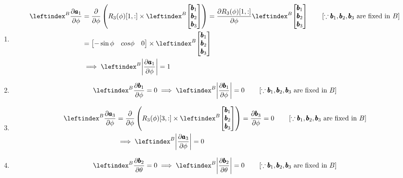 \begin{enumerate}
 \item
 \begin{align*}
   \lx{^B}{\frac {\partial \pmb a_1}  {\partial \phi}}&=
   \frac{\partial}{\partial \phi} \left(R_3(\phi)[1, :]  \times \lx{^B}{\bm{\pmb b_1 \\ \pmb b_2 \\ \pmb b_3}} \right)
   = \frac{\partial R_3(\phi)[1, :]}{\partial \phi} \lx{^B}{\bm{\pmb b_1 \\ \pmb b_2 \\ \pmb b_3}}
   \qquad \left[\because \pmb b_1, \pmb b_2,  \pmb b_3
   \text{ are fixed in } B \right]\\
   &= \bm{-\sin \phi & cos \phi & 0}
    \times \lx{^B}{\bm{\pmb b_1 \\ \pmb b_2 \\ \pmb b_3}}\\
    &\implies \lx{^B}{\norm{\frac {\partial \pmb a_1}  {\partial \phi}}} = 1
 \end{align*}

 \item
 \begin{align*}
    \lx{^B}{\frac {\partial \pmb b_1}  {\partial \phi}} &= 0
    \implies \lx{^B}{\norm{ \frac {\partial \pmb b_1}  {\partial \phi}}} = 0
   \qquad \left[\because \pmb b_1, \pmb b_2,  \pmb b_3
   \text{ are fixed in } B \right]\\
 \end{align*}

 \item
 \begin{align*}
    \lx{^B}{\frac {\partial \pmb a_3}  {\partial \phi}} &=
   \frac{\partial}{\partial \phi} \left(R_3(\phi)[3, :]  \times \lx{^B}{\bm{\pmb b_1 \\ \pmb b_2 \\ \pmb b_3}} \right)
   = \frac{\partial \pmb b_3}{\partial \phi}
   = 0
   \qquad \left[\because \pmb b_1, \pmb b_2,  \pmb b_3
   \text{ are fixed in } B \right]\\
   &\implies \lx{^B}{\norm{\frac {\partial \pmb a_3}  {\partial \phi}}} = 0
 \end{align*}


 \item
 \begin{align*}
    \lx{^B}{\frac {\partial \pmb b_2}  {\partial \theta}} &= 0
    \implies \lx{^B}{\norm{\frac {\partial \pmb b_2}  {\partial \theta}}} = 0
    \qquad \left[\because \pmb b_1, \pmb b_2,  \pmb b_3
   \text{ are fixed in } B \right]\\
 \end{align*}


\end{enumerate}

